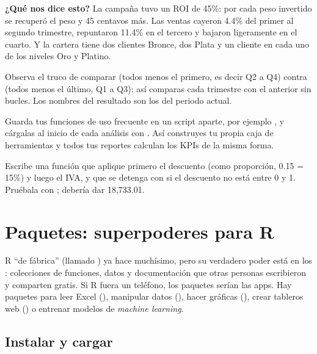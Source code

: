 \textbf{¿Qué nos dice esto?} La campaña tuvo un ROI de 45\%: por cada peso
invertido se recuperó el peso y 45 centavos más. Las ventas cayeron 4.4\% del
primer al segundo trimestre, repuntaron 11.4\% en el tercero y bajaron
ligeramente en el cuarto. Y la cartera tiene dos clientes Bronce, dos Plata
y un cliente en cada uno de los niveles Oro y Platino.

Observa el truco de comparar  (todos menos el primero, es
decir Q2 a Q4) contra  (todos menos el último, Q1
a Q3): así comparas cada trimestre con el anterior sin bucles. Los nombres
del resultado son los del periodo actual.

\begin{consejo}
Guarda tus funciones de uso frecuente en un script aparte, por ejemplo
, y cárgalas al inicio de cada análisis con
. Así construyes tu propia caja de
herramientas y todos tus reportes calculan los KPIs de la misma forma.
\end{consejo}

\begin{hazlotu}
Escribe una función  que aplique primero el descuento (como proporción, 0.15 = 15\%) y
luego el IVA, y que se detenga con  si el descuento no está
entre 0 y 1. Pruébala con ; debería dar
18,733.01.
\end{hazlotu}

\section{Paquetes: superpoderes para R}
\label{sec:m1-paquetes}

R ``de fábrica'' (llamado ) ya hace muchísimo, pero su
verdadero poder está en los : colecciones de funciones,
datos y documentación que otras personas escribieron y comparten gratis. Si
R fuera un teléfono, los paquetes serían las apps. Hay paquetes para leer
Excel (), manipular datos (), hacer gráficas
(), crear tableros web () o entrenar
modelos de \emph{machine learning}.

\subsection{Instalar y cargar}

